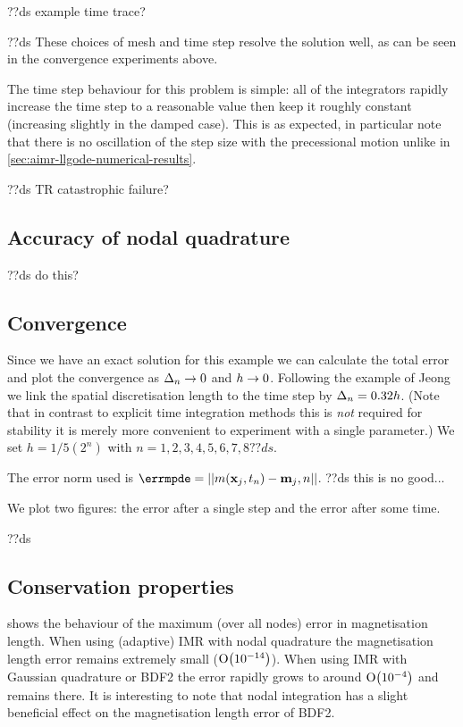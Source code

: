 ??ds example time trace?

??ds These choices of mesh and time step resolve the solution well, as can be seen in the convergence experiments above.

The time step behaviour for this problem is simple: all of the integrators rapidly increase the time step to a reasonable value then keep it roughly constant (increasing slightly in the damped case).
This is as expected, in particular note that there is no oscillation of the step size with the precessional motion unlike in \cref{sec:aimr-llgode-numerical-results}.


??ds TR catastrophic failure?


\subsection{Accuracy of nodal quadrature}

??ds do this?



\subsection{Convergence}

Since we have an exact solution for this example we can calculate the total error and plot the convergence as $\Delta_{n} \rightarrow 0$ and $h \rightarrow 0$.
Following the example of Jeong \etal \cite{Jeong2014} we link the spatial discretisation length to the time step by $\Delta_{n} = 0.32h$. (Note that in contrast to explicit time integration methods this is \emph{not} required for stability it is merely more convenient to experiment with a single parameter.)
We set $h = 1/5(2^n)$ with $n=1,2,3,4,5,6,7,8 ??ds$.

The error norm used is $\errmpde = \norm{m(\xv_j, t_n) - \mv_j,n}$. ??ds this is no good...

We plot two figures: the error after a single step and the error after some time.

??ds


\subsection{Conservation properties}
\label{sec:2d-wave-results-cons-prop}

 shows the behaviour of the maximum (over all nodes) error in magnetisation length.
When using (adaptive) IMR with nodal quadrature the magnetisation length error remains extremely small ($\mathrm{O}{\left( 10^{-14} \right)}$).
When using IMR with Gaussian quadrature or BDF2 the error rapidly grows to around $\mathrm{O}{\left( 10^{-4} \right)}$ and remains there.
It is interesting to note that nodal integration has a slight beneficial effect on the magnetisation length error of BDF2.

